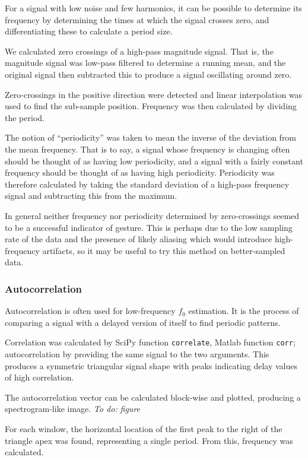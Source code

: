 \documentclass{article}
\newcommand{\todo}[1]{\emph{To do: #1}}
\newcommand{\func}[1]{\texttt{#1}}
\begin{document}
For a signal with low noise and few harmonics, it can be possible to
determine its frequency by determining the times at which the signal
crosses zero, and differentiating these to calculate a period size.

We calculated zero crossings of a high-pass magnitude signal.  That
is, the magnitude signal was low-pass filtered to determine a running
mean, and the original signal then subtracted this to produce a signal
oscillating around zero.

Zero-crossings in the positive direction were detected and linear
interpolation was used to find the sub-sample position.
Frequency was then calculated by dividing the period.

The notion of ``periodicity'' was taken to mean the inverse of the
deviation from the mean frequency.
That is to say, a signal whose frequency is changing often should be
thought of as having low periodicity, and a signal with a fairly
constant frequency should be thought of as having high periodicity.
Periodicity was therefore calculated by taking the standard deviation
of a high-pass frequency signal and subtracting this from the maximum.

In general neither frequency nor periodicity determined by
zero-crossings seemed to be a successful indicator of gesture.
This is perhaps due to the low sampling rate of the data and the
presence of likely aliasing which would introduce high-frequency
artifacts, so it may be useful to try this method on better-sampled
data.

\subsubsection{Autocorrelation}

Autocorrelation is often used for low-frequency $f_0$ estimation.
It is the process of comparing a signal with a delayed version of
itself to find periodic patterns.

Correlation was calculated by SciPy function \func{correlate}, Matlab
function \func{corr}; autocorrelation by providing the same signal to
the two arguments.
This produces a symmetric triangular signal shape with peaks
indicating delay values of high correlation.

The autocorrelation vector can be calculated block-wise and plotted,
producing a spectrogram-like image. \todo{figure}

For each window, the horizontal location of the first peak to the
right of the triangle apex was found, representing a single period.
From this, frequency was calculated.
\end{document}
